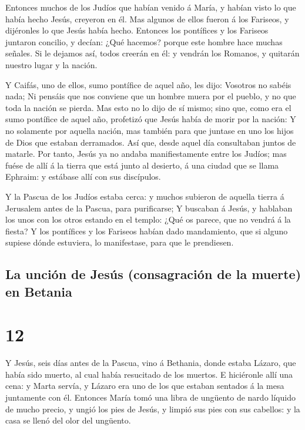  Entonces muchos de los Judíos que habían venido á María,
y habían visto lo que había hecho Jesús, creyeron en él. 
Mas algunos de ellos fueron á los Fariseos, y dijéronles lo que Jesús
había hecho.  Entonces los pontífices y los Fariseos
juntaron concilio, y decían: ¿Qué hacemos? porque este hombre hace
muchas señales.  Si le dejamos así, todos creerán en él:
y vendrán los Romanos, y quitarán nuestro lugar y la nación.

 Y Caifás, uno de ellos, sumo pontífice de aquel año, les
dijo: Vosotros no sabéis nada;  Ni pensáis que nos
conviene que un hombre muera por el pueblo, y no que toda la nación se
pierda.  Mas esto no lo dijo de sí mismo; sino que, como
era el sumo pontífice de aquel año, profetizó que Jesús había de morir
por la nación:  Y no solamente por aquella nación, mas
también para que juntase en uno los hijos de Dios que estaban
derramados.  Así que, desde aquel día consultaban juntos
de matarle.  Por tanto, Jesús ya no andaba
manifiestamente entre los Judíos; mas fuése de allí á la tierra que está
junto al desierto, á una ciudad que se llama Ephraim: y estábase allí
con sus discípulos.

 Y la Pascua de los Judíos estaba cerca: y muchos
subieron de aquella tierra á Jerusalem antes de la Pascua, para
purificarse;  Y buscaban á Jesús, y hablaban los unos con
los otros estando en el templo: ¿Qué os parece, que no vendrá á la
fiesta?  Y los pontífices y los Fariseos habían dado
mandamiento, que si alguno supiese dónde estuviera, lo manifestase, para
que le prendiesen.

\hypertarget{la-unciuxf3n-de-jesuxfas-consagraciuxf3n-de-la-muerte-en-betania}{%
\subsection{La unción de Jesús (consagración de la muerte) en
Betania}\label{la-unciuxf3n-de-jesuxfas-consagraciuxf3n-de-la-muerte-en-betania}}

\hypertarget{section-11}{%
\section{12}\label{section-11}}

 Y Jesús, seis días antes de la Pascua, vino á Bethania,
donde estaba Lázaro, que había sido muerto, al cual había resucitado de
los muertos.  E hiciéronle allí una cena: y Marta servía,
y Lázaro era uno de los que estaban sentados á la mesa juntamente con
él.  Entonces María tomó una libra de ungüento de nardo
líquido de mucho precio, y ungió los pies de Jesús, y limpió sus pies
con sus cabellos: y la casa se llenó del olor del ungüento.

